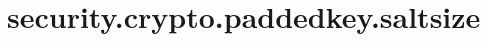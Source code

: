 \section{security.crypto.paddedkey.saltsize}
\label{configuration:SecurityCryptoPaddedkeySaltsize}
\TODO
